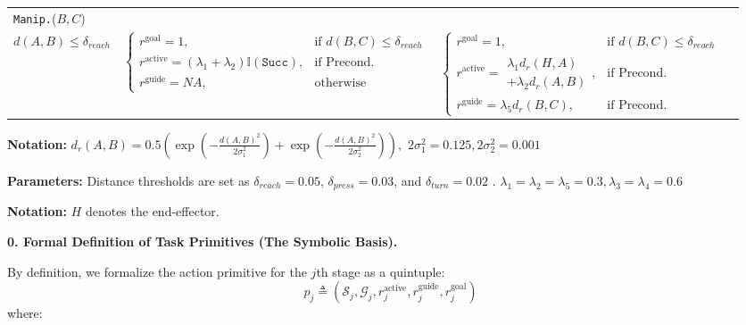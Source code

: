 \documentclass{article}
\begin{document}
\begin{table}[!htbp]
\begin{threeparttable}
\begin{tabular}{l l l l}
\texttt{Manip.}($B, C$) & 
\makecell{$d(H, A) \le \delta_{reach}$ \\ $d(A, B) \le \delta_{reach}$} & 
$\begin{cases} 
r^{\text{goal}}=1, & \text{if } d(B, C) \le \delta_{reach} \\ 
r^{\text{active}}=(\lambda_1 + \lambda_2)\mathbb{I}(\texttt{Succ}), & \text{if } \text{Precond.} \\ 
r^{\text{guide}}= NA, & \text{otherwise} 
\end{cases}$ & 
$\begin{cases} 
r^{\text{goal}}=1, & \text{if } d(B, C) \le \delta_{reach} \\ 
r^{\text{active}}= \begin{aligned} \lambda_1 d_r(H, A) \\  + \lambda_2 d_r(A, B) \end{aligned}, & \text{if } \text{Precond.} \\
r^{\text{guide}}= \lambda_5 d_r(B, C),  & \text{if } \text{Precond.} 
\end{cases}$ \\


\bottomrule
\end{tabular}

\begin{tablenotes}
\footnotesize
\item \textbf{Notation:} ${d_{r}(A,B)=0.5(\exp \left( -\frac{d(A, B)^2}{2\sigma_1^2} \right) + \exp \left( -\frac{d(A, B)^2}{2\sigma_2^2}\right)) },$ $2\sigma_1^2=0.125,2\sigma_2^2=0.001$ %
\item \textbf{Parameters:} Distance thresholds are set as $\delta_{reach} =  0.05$, $\delta_{press} = 0.03$, and $\delta_{turn} = 0.02$ . $\lambda_1=\lambda_2=\lambda_5=0.3,\lambda_3=\lambda_4=0.6$
\item \textbf{Notation:} $H$ denotes the end-effector.
\end{tablenotes}
\end{threeparttable}
\end{table}



\textbf{0. Formal Definition of Task Primitives (The Symbolic Basis).}

By definition, we formalize the action primitive for the $j$th stage as a quintuple:
$$p_j \triangleq \left( \mathcal{S}_j, \mathcal{G}_j, r_j^{\text{active}}, r_j^{\text{guide}}, r_j^{\text{goal}} \right)$$
where:
\end{document}
